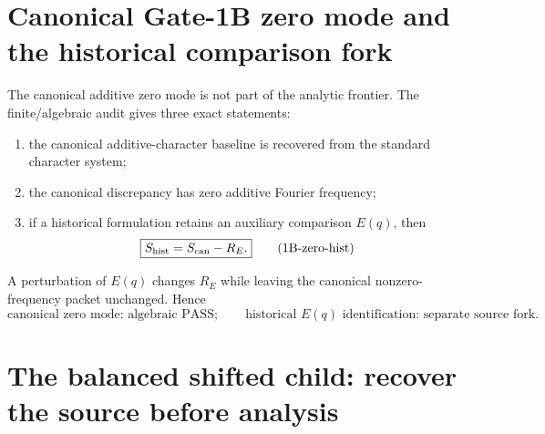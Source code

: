 \documentclass[11pt]{article}
\theoremstyle{definition}
\theoremstyle{remark}
\newcommand{\1}{\mathbf 1}
\begin{document}
\section{Canonical Gate-1B zero mode and the historical comparison fork}
\label{sec:g1b-zero}

The canonical additive zero mode is not part of the analytic frontier.  The finite/algebraic audit gives three
exact statements:
\begin{enumerate}[label=(\roman*)]
\item the canonical additive-character baseline is recovered from the standard character system;
\item the canonical discrepancy has zero additive Fourier frequency;
\item if a historical formulation retains an auxiliary comparison $E(q)$, then
\[
 \boxed{S_{\rm hist}=S_{\rm can}-R_E.}
\tag{1B-zero-hist}
\]
\end{enumerate}
A perturbation of $E(q)$ changes $R_E$ while leaving the canonical nonzero-frequency packet unchanged.  Hence
\[
 \boxed{\text{canonical zero mode: algebraic PASS};\qquad
        \text{historical }E(q)\text{ identification: separate source fork}.}
\tag{1B-zero-status}
\]

\section{The balanced shifted child: recover the source before analysis}
\label{sec:g1b-shifted-child}
\end{document}
